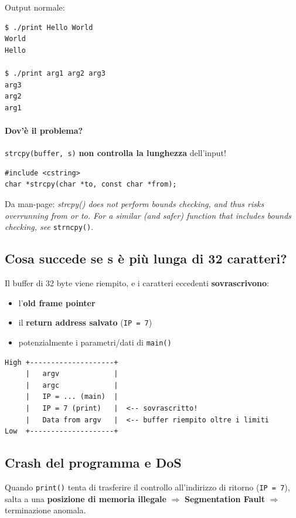 Output normale:
\begin{verbatim}
$ ./print Hello World
World
Hello

$ ./print arg1 arg2 arg3
arg3
arg2
arg1
\end{verbatim}

\paragraph{Dov'\`e il problema?} \texttt{strcpy(buffer, s)} \textbf{non controlla la lunghezza} dell'input!
\begin{verbatim}
#include <cstring>
char *strcpy(char *to, const char *from);
\end{verbatim}
Da man-page: \textit{strcpy() does not perform bounds checking, and thus risks overrunning from or to. For a similar (and safer) function that includes bounds checking, see} \texttt{strncpy()}.

\subsection{Cosa succede se s \`e pi\`u lunga di 32 caratteri?}

Il buffer di 32 byte viene riempito, e i caratteri eccedenti \textbf{sovrascrivono}:
\begin{itemize}
  \item l'\textbf{old frame pointer}
  \item il \textbf{return address salvato} (\texttt{IP = 7})
  \item potenzialmente i parametri/dati di \texttt{main()}
\end{itemize}

\begin{verbatim}
High +--------------------+
     |   argv             |
     |   argc             |
     |   IP = ... (main)  |
     |   IP = 7 (print)   |  <-- sovrascritto!
     |   Data from argv   |  <-- buffer riempito oltre i limiti
Low  +--------------------+
\end{verbatim}

\subsection{Crash del programma e DoS}

Quando \texttt{print()} tenta di trasferire il controllo all'indirizzo di ritorno (\texttt{IP = 7}), salta a una \textbf{posizione di memoria illegale} $\Rightarrow$ \textbf{Segmentation Fault} $\Rightarrow$ terminazione anomala.

